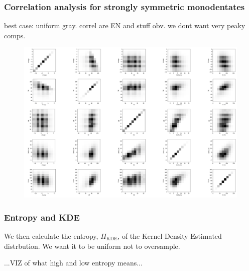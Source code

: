 \documentclass[xcolor=dvipsnames]{beamer}
\begin{document}
\begin{frame}
\frametitle{Correlation analysis for strongly symmetric monodentates }
best case: uniform gray. correl are EN and stuff obv. we dont want very peaky comps.
\begin{figure}
\includegraphics[width=0.65\linewidth]{img/strongsymMonodentates_PairwiseCorr.png}
\end{figure}
\centering
\end{frame}

\begin{frame}
\frametitle{Entropy and KDE}
We then calculate the entropy, $H_{\textrm{KDE}}$, of the Kernel Density Estimated distrbution. We want it to be uniform not to oversample.

...VIZ of what high and low entropy means...
\end{frame}
\end{document}
